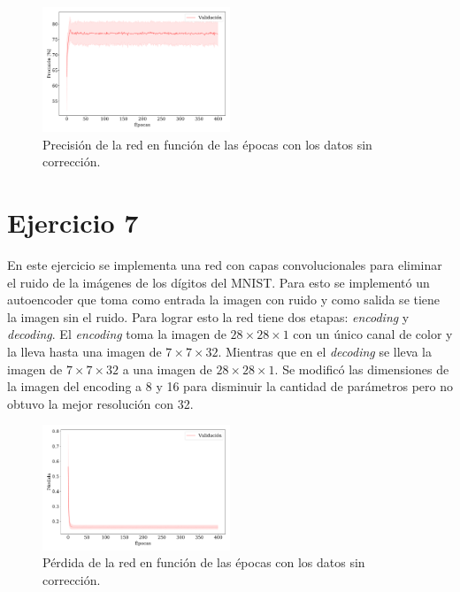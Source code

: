     \begin{figure}[H]
        \begin{small}
            \begin{center}
                \includegraphics[width=0.5\textwidth]{Graphs/ejer6_acc_raw.pdf}
            \end{center}
            \caption{Precisión de la red en función de las épocas con los datos sin corrección.}
            \label{fig:ejer6_acc_raw}
        \end{small}
    \end{figure}




\section*{Ejercicio 7}

    En este ejercicio se implementa una red con capas convolucionales  para eliminar el ruido de la imágenes de los dígitos del MNIST. Para esto se implementó un autoencoder que toma como entrada la imagen  con ruido y como salida se tiene la imagen sin el ruido. Para lograr esto la red tiene dos etapas: \emph{encoding} y \emph{decoding}. El \emph{encoding} toma la imagen de $28\times28\times1$ con un único canal de color y la lleva hasta una imagen de $7\times7\times32$. Mientras que en el \emph{decoding} se lleva la imagen de $7\times7\times32$ a una imagen de $28\times28\times1$.   Se modificó las dimensiones de la imagen del encoding a 8 y 16 para disminuir la cantidad de parámetros pero no obtuvo la mejor resolución con 32.

    \begin{figure}[H]
        \begin{small}
            \begin{center}
                \includegraphics[width=0.5\textwidth]{Graphs/ejer6_loss_raw.pdf}
            \end{center}
            \caption{Pérdida de la red en función de las épocas con los datos sin corrección. }
            \label{fig:ejer6_loss_raw}
        \end{small}
    \end{figure}

